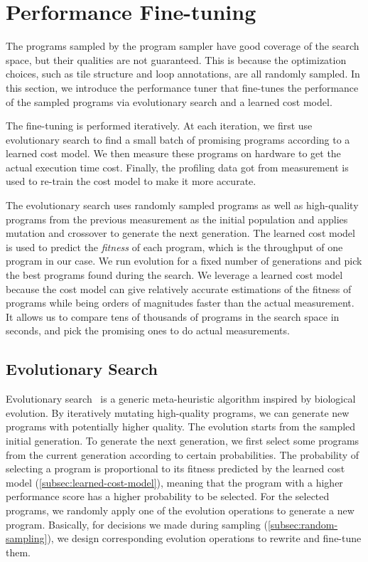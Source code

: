 \section{Performance Fine-tuning}
\label{sec:performance-fine-tuning}
\postsec

The programs sampled by the program sampler have good coverage of the search space, but their qualities are not guaranteed.
This is because the optimization choices, such as tile structure and loop annotations, are all randomly sampled.
In this section, we introduce the performance tuner that fine-tunes the performance of the sampled programs via evolutionary search and a learned cost model.

The fine-tuning is performed iteratively. At each iteration, we first use evolutionary search to find a small batch of promising programs according to a learned cost model.  We then measure these programs on hardware to get the actual execution time cost. Finally, the profiling data got from measurement is used to re-train the cost model to make it more accurate.

The evolutionary search uses randomly sampled programs as well as high-quality programs from the previous measurement as the initial population and applies mutation and crossover to generate the next generation. The learned cost model is used to predict the \textit{fitness} of each program, which is the throughput of one program in our case.
We run evolution for a fixed number of generations and pick the best programs found during the search.
We leverage a learned cost model because the cost model can give relatively accurate estimations of the fitness of programs while being orders of magnitudes faster than the actual measurement.
It allows us to compare tens of thousands of programs in the search space in seconds, and pick the promising ones to do actual measurements.

\subsection{Evolutionary Search}
\label{subsec:evolutionary-search}

Evolutionary search~\cite{vikhar2016evolutionary} is a generic meta-heuristic algorithm inspired by biological evolution. By iteratively mutating high-quality programs, we can generate new programs with potentially higher quality. The evolution starts from the sampled initial generation.
To generate the next generation, we first select some programs from the current generation according to certain probabilities. The probability of selecting a program is proportional to its fitness predicted by the learned cost model (\autoref{subsec:learned-cost-model}), meaning that the program with a higher performance score has a higher probability to be selected.
For the selected programs, we randomly apply one of the evolution operations to generate a new program. Basically, for decisions we made during sampling (\autoref{subsec:random-sampling}), we design corresponding evolution operations to rewrite and fine-tune them.

